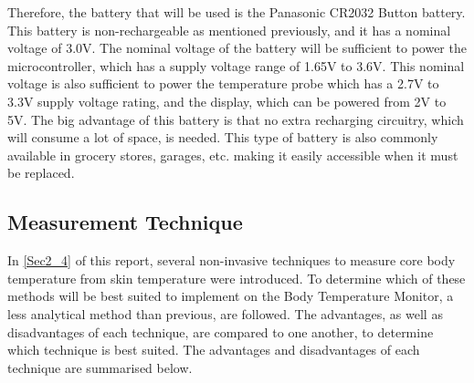 \noindent
Therefore, the battery that will be used is the Panasonic CR2032 Button battery. This battery is non-rechargeable as mentioned previously, and it has a nominal voltage of 3.0V. The nominal voltage of the battery will be sufficient to power the microcontroller, which has a supply voltage range of 1.65V to 3.6V. This nominal voltage is also sufficient to power the temperature probe which has a 2.7V to 3.3V supply voltage rating, and the display, which can be powered from 2V to 5V. The big advantage of this battery is that no extra recharging circuitry, which will consume a lot of space, is needed. This type of battery is also commonly available in grocery stores, garages, etc. making it easily accessible when it must be replaced. 

\subsection{Measurement Technique}\label{technique}
In \autoref{Sec2_4} of this report, several non-invasive techniques to measure core body temperature from skin temperature were introduced. To determine which of these methods will be best suited to implement on the Body Temperature Monitor, a less analytical method than previous, are followed. The advantages, as well as disadvantages of each technique, are compared to one another, to determine which technique is best suited. The advantages and disadvantages of each technique are summarised below.
